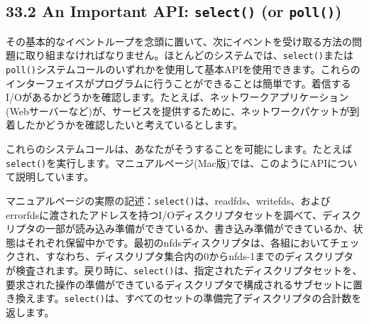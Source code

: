 \hypertarget{an-important-api-select-or-poll}{%
\subsection*{\texorpdfstring{33.2 An Important API: \texttt{select()} (or
\texttt{poll()})}{33.2 An Important API: select() (or poll())}}\label{an-important-api-select-or-poll}}

その基本的なイベントループを念頭に置いて、次にイベントを受け取る方法の問題に取り組まなければなりません。ほとんどのシステムでは、\texttt{select()}または\texttt{poll()}システムコールのいずれかを使用して基本APIを使用できます。これらのインターフェイスがプログラムに行うことができることは簡単です。着信するI/Oがあるかどうかを確認します。たとえば、ネットワークアプリケーション(Webサーバーなど)が、サービスを提供するために、ネットワークパケットが到着したかどうかを確認したいと考えているとします。

これらのシステムコールは、あなたがそうすることを可能にします。たとえば\texttt{select()}を実行します。マニュアルページ(Mac版)では、このようにAPIについて説明しています。

\begin{Shaded}
\begin{Highlighting}[]
\end{Highlighting}
\end{Shaded}

マニュアルページの実際の記述：\texttt{select()}は、readfds、writefds、およびerrorfdsに渡されたアドレスを持つI/Oディスクリプタセットを調べて、ディスクリプタの一部が読み込み準備ができているか、書き込み準備ができているか、状態はそれぞれ保留中かです。最初のnfdsディスクリプタは、各組においてチェックされ、すなわち、ディスクリプタ集合内の0からnfds-1までのディスクリプタが検査されます。戻り時に、\texttt{select()}は、指定されたディスクリプタセットを、要求された操作の準備ができているディスクリプタで構成されるサブセットに置き換えます。\texttt{select()}は、すべてのセットの準備完了ディスクリプタの合計数を返します。

